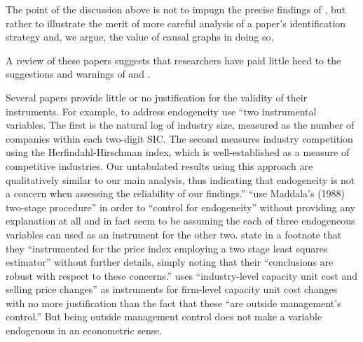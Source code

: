 \documentclass[11pt]{amsart}
\begin{document}
The point of the discussion above is not to impugn the precise findings of \citet{Balakrishnan:2014js}, but rather to illustrate the merit of more careful analysis of a paper's identification strategy and, we argue, the value of causal graphs in doing so.


A review of these papers suggests that researchers have paid little heed to the suggestions and warnings of  \citet{Larcker:2010fq} and \citet{Roberts:2013cz}.

Several papers provide little or no justification for the validity of their instruments. For example, to address endogeneity \citet{Cohen:2014jl} use ``two instrumental variables. The first is the natural log of industry size, measured as the number of companies within each two-digit SIC. The second measures industry competition using the Herfindahl-Hirschman index, which is well-established as a measure of competitive industries. Our untabulated results using this approach are qualitatively similar to our main analysis, thus indicating that endogeneity is not a concern when assessing the reliability of our findings.''
\citet{Vermeer:2014bs} ``use Maddala's (1988) two-stage procedure'' in order to ``control for endogeneity'' without providing any explanation at all and in fact seem to be assuming the each of three endogeneous variables can used as an instrument for the other two.
\citet[p.48]{Fox:2014io} state in a footnote that they ``instrumented for the price index employing a two stage least squares estimator'' without further details, simply noting that their ``conclusions are robust with respect to these concerns.''
\citet{Cannon:2014im} uses ``industry-level capacity unit cost and selling price changes'' as instruments for firm-level capacity unit cost changes with no more justification than the fact that these ``are outside management's control.'' But being outside management control does not make a variable endogenous in an econometric sense.
\end{document}
